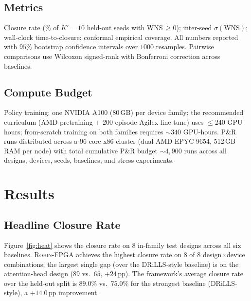 \documentclass[journal]{IEEEtran}
\begin{document}
\subsection{Metrics}
Closure rate (\% of $K' = 10$ held-out seeds with WNS\,$\geq 0$); inter-seed $\sigma(\mathrm{WNS})$; wall-clock time-to-closure; conformal empirical coverage. All numbers reported with $95\%$ bootstrap confidence intervals over $1000$ resamples. Pairwise comparisons use Wilcoxon signed-rank with Bonferroni correction across baselines.

\subsection{Compute Budget}
Policy training: one NVIDIA A100 (80\,GB) per device family; the recommended curriculum (AMD pretraining $+$ $200$-episode Agilex fine-tune) uses $\leq 240$ GPU-hours; from-scratch training on both families requires ${\sim}340$ GPU-hours. P\&R runs distributed across a 96-core x86 cluster (dual AMD EPYC 9654, 512\,GB RAM per node) with total cumulative P\&R budget $\sim 4{,}900$ runs across all designs, devices, seeds, baselines, and stress experiments.

\section{Results}
\label{sec:results}

\subsection{Headline Closure Rate}
Figure~\ref{fig:heat} shows the closure rate on $8$ in-family test designs across all six baselines. \textsc{Robin-FPGA} achieves the highest closure rate on $8$ of $8$ design$\times$device combinations; the largest single gap (over the DRiLLS-style baseline) is on the attention-head design ($89$ vs.\ $65$, $+24$\,pp). The framework's average closure rate over the held-out split is $89.0\%$ vs.\ $75.0\%$ for the strongest baseline (DRiLLS-style), a $+14.0$\,pp improvement.
\end{document}
